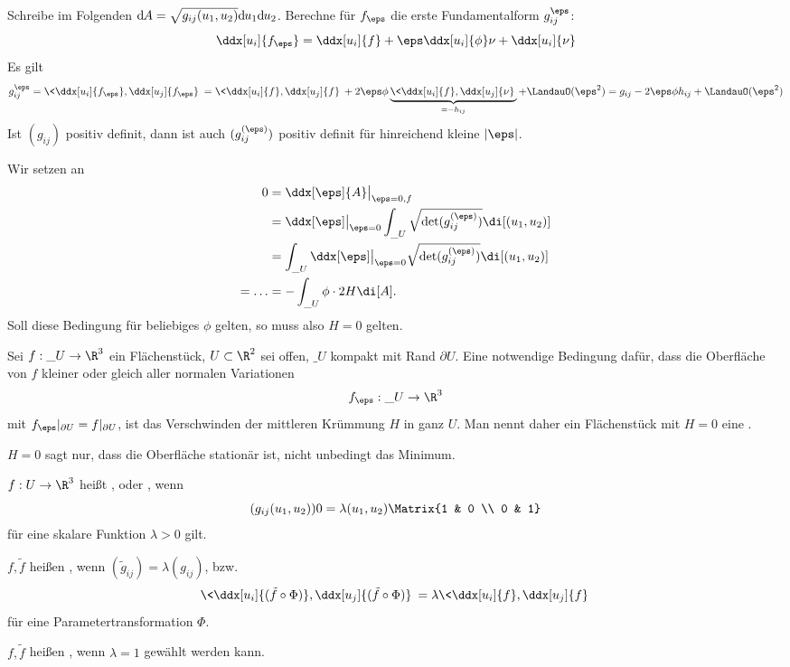 Schreibe im Folgenden $\dx[A] = \sqrt{g_{ij}(u_1, u_2)} \dx[u_1] \dx[u_2]$.
Berechne für $f_\eps$ die erste Fundamentalform $g_{ij}^{\eps}$:
\[
	\ddx[u_i]{f_\eps}
	= \ddx[u_i]{f} + \eps \ddx[u_i]{\phi} \nu + \ddx[u_i]{\nu}
\]
Es gilt
\[
	g_{ij}^{\eps}
	= \< \ddx[u_i]{f_\eps} , \ddx[u_j]{f_\eps} \>
	= \< \ddx[u_i]{f}, \ddx[u_j]{f} \> + 2 \eps \phi \underbrace{\<\ddx[u_i]{f}, \ddx[u_j]{\nu} \>}_{=-h_{ij}} + \LandauO(\eps^2)
	= g_{ij} - 2\eps\phi h_{ij} + \LandauO(\eps^2)
\]
Ist $(g_{ij})$ positiv definit, dann ist auch $(g_{ij}^{(\eps)})$ positiv definit für hinreichend kleine $|\eps|$.

Wir setzen an
\begin{align*}
	0 &= \ddx[\eps]{A}\big|_{\eps = 0, f} \\
	&= \ddx[\eps] \big|_{\eps = 0} \int_{\_U} \sqrt{\det(g_{ij}^{(\eps)})} \di[(u_1, u_2)] \\
	&= \int_{\_U} \ddx[\eps] \big|_{\eps = 0} \sqrt{\det(g_{ij}^{(\eps)})} \di[(u_1, u_2)] \\
	= \dotsc
	&= -\int_{\_U} \phi \cdot 2H \di[A].
\end{align*}
Soll diese Bedingung für beliebiges $\phi$ gelten, so muss also $H = 0$ gelten.

\begin{df}[Minimalfläche]
	Sei $f: \_U \to \R^3$ ein Flächenstück, $U \subset \R^2$ sei offen, $\_U$ kompakt mit Rand $\partial U$.
	Eine notwendige Bedingung dafür, dass die Oberfläche von $f$ kleiner oder gleich aller normalen Variationen
	\[
		f_\eps: \_U \to \R^3
	\]
	mit $f_\eps|_{\partial U} = f|_{\partial U}$, ist das Verschwinden der mittleren Krümmung $H$ in ganz $U$.
	Man nennt daher ein Flächenstück mit $H = 0$ eine .
	\begin{note}
		$H = 0$ sagt nur, dass die Oberfläche stationär ist, nicht unbedingt das Minimum.
	\end{note}
\end{df}

\begin{df}
	$f: U \to \R^3$ heißt , oder , wenn
	\[
		(g_{ij}(u_1, u_2))0= \lambda(u_1, u_2) \Matrix{1 & 0 \\ 0 & 1}
	\]
	für eine skalare Funktion $\lambda > 0$ gilt.

	$f, \tilde f$ heißen , wenn $(\tilde g_{ij}) = \lambda (g_{ij})$, bzw.
	\[
		\< \ddx[u_i]{(\tilde f \circ \Phi)}, \ddx[u_j]{(\tilde f \circ \Phi)} \>
		= \lambda \< \ddx[u_i]{f}, \ddx[u_j]{f} \>
	\]
	für eine Parametertransformation $\Phi$.

	$f, \tilde f$ heißen , wenn $\lambda = 1$ gewählt werden kann.
\end{df}

